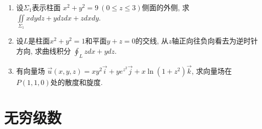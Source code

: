 \begin{enumerate}
	\item 设$\Sigma_1$表示柱面 $x^2+y^2 = 9 \ (0 \leq z \leq 3)$侧面的外侧, 求 $\iint\limits_{\Sigma_1} xdydz + ydzdx + zdxdy$.

	
	\item 设$L$是柱面$x^2+y^2=1$和平面$y+z=0$的交线, 从$z$轴正向往负向看去为逆时针方向, 求曲线积分 $\oint_L zdx + ydz$.
	
	\item 有向量场 $\vec{u}(x,y,z) = xy^2\vec{i} + ye^{z^2}\vec{j} + x\ln(1+z^2)\vec{k}$, 求向量场在 $P(1,1,0)$处的散度和旋度.
	
\end{enumerate}

\newpage

\section{无穷级数}
